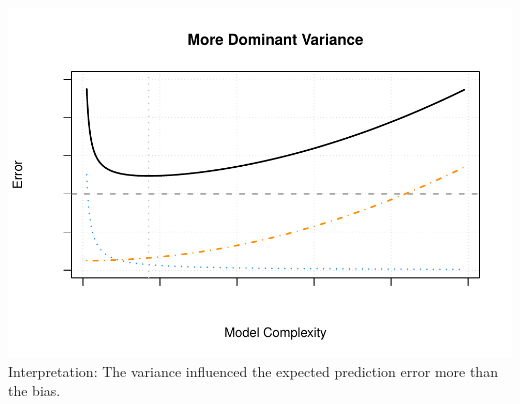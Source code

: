 \documentclass[]{report}
\begin{document}
\includegraphics{MyBook_files/figure-latex/unnamed-chunk-96-1.pdf}
Interpretation: The variance influenced the expected prediction error
more than the bias.
\end{document}
